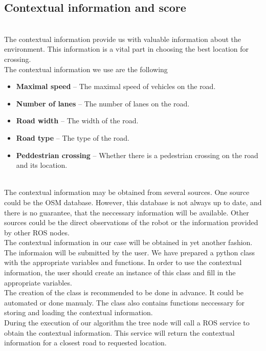     \subsection{Contextual information and score}
    \label{sec:context}
        \\
            The contextual information provide us with valuable information about the environment. This information is a vital part in choosing the best location for crossing.\\
            The contextual information we use are the following
            \begin{itemize}
                \item \textbf{Maximal speed} -- The maximal speed of vehicles on the road.
                \item \textbf{Number of lanes} -- The number of lanes on the road.
                \item \textbf{Road width} -- The width of the road.
                \item \textbf{Road type} -- The type of the road.
                \item \textbf{Peddestrian crossing} -- Whether there is a pedestrian crossing on the road and its location.
            \end{itemize}
        \\
            The contextual information may be obtained from several sources. One source could be the OSM database. However, this database is not always up to date, and there is no guarantee, that the neccessary information will be available. Other sources could be the direct observations of the robot or the information provided by other ROS nodes.\\
            The contextual information in our case will be obtained in yet another fashion. The informaion will be submitted by the user. We have prepared a python class with the appropriate variables and functions. In order to use the contextual information, the user should create an instance of this class and fill in the appropriate variables.\\
            The creation of the class is recommended to be done in advance. It could be automated or done manualy. The class also contains functions neccessary for storing and loading the contextual information.\\
            During the execution of our algorithm the tree node will call a ROS service to obtain the contextual information. This service will return the contextual information for a closest road to requested location.\\
